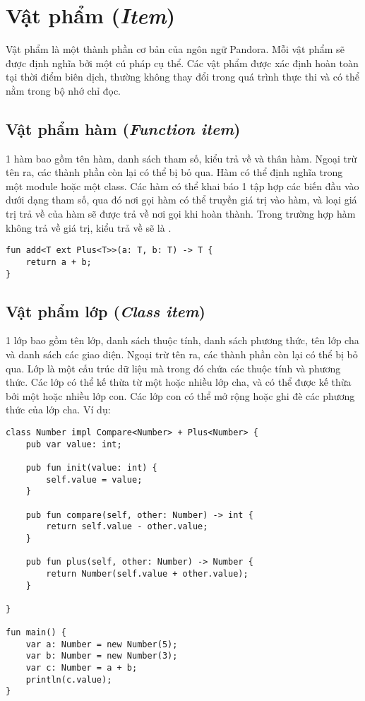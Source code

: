 \section{Vật phẩm (\textit{Item})}

\regexitem

Vật phẩm là một thành phần cơ bản của ngôn ngữ Pandora. Mỗi vật phẩm sẽ được định nghĩa bởi một cú pháp cụ thể. Các vật phẩm được xác định hoàn toàn tại thời điểm biên dịch, thường không thay đổi trong quá trình thực thi và có thể nằm trong bộ nhớ chỉ đọc.

\subsection{Vật phẩm hàm (\textit{Function item})}          

\regexfunitem

1 hàm bao gồm tên hàm, danh sách tham số, kiểu trả về và thân hàm. Ngoại trừ tên ra, các thành phần còn lại có thể bị bỏ qua. Hàm có thể định nghĩa trong một module hoặc một class. Các hàm có thể khai báo 1 tập hợp các biến đầu vào dưới dạng tham số, qua đó nơi gọi hàm có thể truyền giá trị vào hàm, và loại giá trị trả về của hàm sẽ được trả về nơi gọi khi hoàn thành. Trong trường hợp hàm không trả về giá trị, kiểu trả về sẽ là .

\begin{lstlisting}[]
fun add<T ext Plus<T>>(a: T, b: T) -> T {
    return a + b;
}
\end{lstlisting}

\subsection{Vật phẩm lớp (\textit{Class item})}

\regexclassitem

1 lớp bao gồm tên lớp, danh sách thuộc tính, danh sách phương thức, tên lớp cha và danh sách các giao diện. Ngoại trừ tên ra, các thành phần còn lại có thể bị bỏ qua. Lớp là một cấu trúc dữ liệu mà trong đó chứa các thuộc tính và phương thức. Các lớp có thể kế thừa từ một hoặc nhiều lớp cha, và có thể được kế thừa bởi một hoặc nhiều lớp con. Các lớp con có thể mở rộng hoặc ghi đè các phương thức của lớp cha. Ví dụ:

\begin{lstlisting}[]
class Number impl Compare<Number> + Plus<Number> {
    pub var value: int;

    pub fun init(value: int) {
        self.value = value;
    }

    pub fun compare(self, other: Number) -> int {
        return self.value - other.value;
    }

    pub fun plus(self, other: Number) -> Number {
        return Number(self.value + other.value);
    }

}

fun main() {
    var a: Number = new Number(5);
    var b: Number = new Number(3);
    var c: Number = a + b;
    println(c.value);
}
\end{lstlisting}

